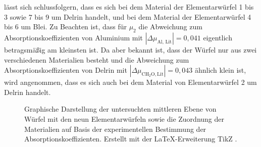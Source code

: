lässt sich schlussfolgern, dass es sich bei dem Material der Elementarwürfel 1 bis 3 sowie 7 bis 9 um Delrin handelt, und bei dem 
Material der Elementarwürfel 4 bis 6 um Blei. 
Zu Beachten ist, dass für $\mu_2$ die Abweichung zum Absorptionskoeffizienten
von Aluminium mit $|\Delta {\mu_\text{Al, Lit}}| = 0,041$ eigentlich betragsmäßig am kleinsten ist. Da aber bekannt ist, dass der Würfel nur aus zwei verschiedenen Materialien besteht
und die Abweichung zum Absorptionskoeffizienten von Delrin mit $|\Delta {\mu_{\text{CH}_2\text{O}, \text{Lit}}}| = 0,043$ ähnlich klein ist, wird
angenommen, dass es sich auch bei dem Material von Elementarwürfel 2 um Delrin handelt. 
\begin{figure}
    \centering
    \caption{Graphische Darstellung der untersuchten mittleren Ebene von Würfel mit den neun Elementarwürfeln sowie die Zuordnung 
    der Materialien auf Basis der experimentellen Bestimmung der Absorptionskoeffizienten. 
    Erstellt mit der \LaTeX-Erweiterung TikZ \cite{tantau:2013a.}.}
    \label{fig:tikz2}
\end{figure}

